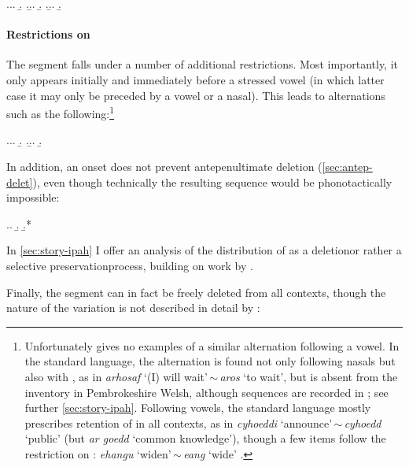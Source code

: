 \ex.\a.\a.
\b.
\z.\b.\a.
\b.
\z.\b.\a.
\b.

\paragraph{Restrictions on }
\label{sec:restrictions-ih}

The segment \ipa{[h]} falls under a number of additional restrictions. Most importantly, it only appears initially and immediately before a stressed vowel (in which latter case it may only be preceded by a vowel or a nasal). This leads to alternations such as the following:\footnote{Unfortunately \citet{awbery86:_pembr_welsh} gives no examples of a similar alternation following a vowel. In the standard language, the alternation is found not only following nasals but also with \ipa{[r̥]}, as in \emph{arhosaf} `(I) will wait'\,$\sim$\,\emph{aros} `to wait', but \ipa{[r̥]} is absent from the inventory in Pembrokeshire Welsh, although \ipa{[rh]} sequences are recorded in \citet{thomas00:_welsh}; see further \cref{sec:story-ipah}. Following vowels, the standard language mostly prescribes retention of \ipa{[h]} in all contexts, as in \emph{cyhoeddi} `announce'\,$\sim$\,\emph{cyhoedd} `public' (but \emph{ar goedd} `common knowledge'), though a few items follow the restriction on \ipa{[h]}: \emph{ehangu} `widen'\,$\sim$\,\emph{eang} `wide' \citep[§II.53]{gyg}.}

\ex.\a.\a.
\b.
\z.\b.\a.
\b.

In addition, an onset \ipa{[h]} does not prevent antepenultimate deletion (\cref{sec:antep-delet}), even though technically the resulting sequence would be phonotactically impossible:

\ex.\a.
\b.
\b.*\mbi{[ˈhsaːne]}

In \cref{sec:story-ipah} I offer an analysis of the distribution of \ipa{[h]} as a deletion\dash or rather a selective preservation\dash process, building on work by \citet{hannahs11:_welsh}.

Finally, the segment \ipa{[h]} can in fact be freely deleted from all contexts, though the nature of the variation is not described in detail by \citet{awbery86:_pembr_welsh}:

